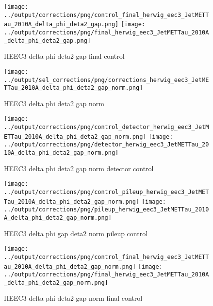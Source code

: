 \documentclass[11pt]{book}
\begin{document}
\begin{figure}[ht]
\centering
\texttt{[image: ../output/corrections/png/control\_final\_herwig\_eec3\_JetMETTau\_2010A\_delta\_phi\_deta2\_gap.png]}
\texttt{[image: ../output/corrections/png/final\_herwig\_eec3\_JetMETTau\_2010A\_delta\_phi\_deta2\_gap.png]}
\caption{HEEC3 delta phi deta2 gap final control}
\label{fig:HEEC3_JetMETTau_2010A_delta_phi_deta2_gap_final_control}
\end{figure}


\begin{figure}[ht]
\centering
\texttt{[image: ../output/sel\_corrections/png/corrections\_herwig\_eec3\_JetMETTau\_2010A\_delta\_phi\_deta2\_gap\_norm.png]}
\caption{HEEC3 delta phi deta2 gap norm}
\label{fig:HEEC3_JetMETTau_2010A_delta_phi_deta2_gap_norm}
\end{figure}


\begin{figure}[ht]
\centering
\texttt{[image: ../output/corrections/png/control\_detector\_herwig\_eec3\_JetMETTau\_2010A\_delta\_phi\_deta2\_gap\_norm.png]}
\texttt{[image: ../output/corrections/png/detector\_herwig\_eec3\_JetMETTau\_2010A\_delta\_phi\_deta2\_gap\_norm.png]}
\caption{HEEC3 delta phi deta2 gap norm detector control}
\label{fig:HEEC3_JetMETTau_2010A_delta_phi_deta2_gap_norm_detector_control}
\end{figure}

\begin{figure}[ht]
\centering
\texttt{[image: ../output/corrections/png/control\_pileup\_herwig\_eec3\_JetMETTau\_2010A\_delta\_phi\_deta2\_gap\_norm.png]}
\texttt{[image: ../output/corrections/png/pileup\_herwig\_eec3\_JetMETTau\_2010A\_delta\_phi\_deta2\_gap\_norm.png]}
\caption{HEEC3 delta phi gap deta2 norm pileup control}
\label{fig:HEEC3_JetMETTau_2010A_delta_phi_deta2_gap_norm_pileup_control}
\end{figure}


\begin{figure}[ht]
\centering
\texttt{[image: ../output/corrections/png/control\_final\_herwig\_eec3\_JetMETTau\_2010A\_delta\_phi\_deta2\_gap\_norm.png]}
\texttt{[image: ../output/corrections/png/final\_herwig\_eec3\_JetMETTau\_2010A\_delta\_phi\_deta2\_gap\_norm.png]}
\caption{HEEC3 delta phi deta2 gap norm final control}
\label{fig:HEEC3_JetMETTau_2010A_delta_phi_deta2_gap_norm_final_control}
\end{figure}
\end{document}
